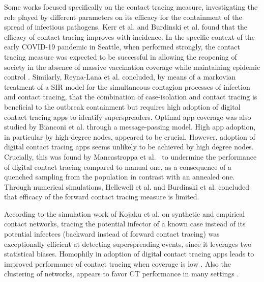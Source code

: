 \documentclass[aps,twocolumn,superscriptaddress,nofootinbib,pre,floatfix]{revtex4-1}
\begin{document}
Some works focused specifically on the contact tracing measure,
investigating the role played by different parameters on its efficacy
for the containment of the spread of infectious pathogens. 
Kerr et al. \cite{Kerr} and Burdinski et al. \cite{Burdinski} found
that the efficacy of contact tracing improves with incidence.
In the specific context of
the early COVID-19 pandemic in Seattle, when performed strongly, the
contact tracing measure was expected to be successful in allowing the
reopening of society in the absence of massive vaccination coverage while
maintaining epidemic control \cite{Kerr}.  Similarly, Reyna-Lana et
al. \cite{ReynaLara} concluded, by means of a markovian treatment of a SIR
model for the simultaneous contagion processes of infection and
contact tracing, that the combination of case-isolation and
contact tracing is beneficial to the outbreak containment but requires
high adoption of digital contact tracing apps to identify
superspreaders.  Optimal app coverage was also studied by Bianconi et
al. \cite{Bianconi} through a message-passing model. High app adoption,
in particular by high-degree nodes, appeared to be crucial.
However, adoption of digital contact tracing apps seems unlikely to be
achieved by high degree nodes.
Crucially, this was found by Mancastroppa et
al.~\cite{Mancastroppa21} to undermine the performance of digital
contact tracing compared to manual one, as a consequence of a
quenched sampling from the population in contrast with an annealed one.
Through numerical simulations, Hellewell et al. \cite{Hellewelllancet}
and Burdinski et al. \cite{Burdinski} concluded that
efficacy of the forward contact tracing measure is limited.


According to the simulation work of Kojaku et al. \cite{kojaku21} on
synthetic and empirical contact networks, tracing the potential
infector of a known case instead of its potential infectees (backward
instead of forward contact tracing) was exceptionally efficient at
detecting superspreading events, since it leverages two statistical
biases.  Homophily in adoption of digital contact tracing apps
leads to improved performance of contact tracing
when coverage is low \cite{Rizi, Burgio}.
Also the clustering of networks, appears to favor CT performance
in many settings \cite{House, Burdinski, Kiss}.
\end{document}

